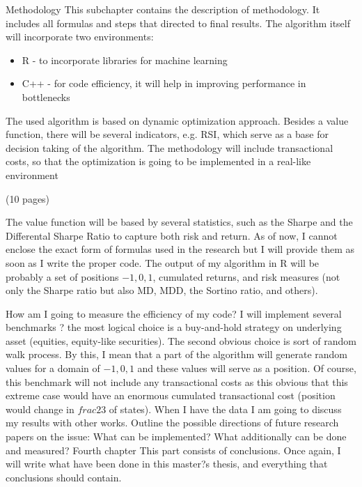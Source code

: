 \documentclass{pracamgr_wne}\usepackage[]{graphicx}\usepackage[]{color}
\begin{document}
Methodology
This subchapter contains the description of methodology. It includes all formulas and steps that directed to final results. 
The algorithm itself will incorporate two environments:
  
\begin{itemize}
\item R - to incorporate libraries for machine learning
\item C++ - for code efficiency, it will help in improving performance in bottlenecks
\end{itemize}

The used algorithm is based on dynamic optimization approach. Besides a value function, there will be several indicators, e.g. RSI, which serve as a base for decision taking of the algorithm. The methodology will include transactional costs, so that the optimization is going to be implemented in a real-like environment

(10 pages)

The value function will be based by several statistics, such as the Sharpe and the Differental Sharpe Ratio to capture both risk and return.
As of now, I cannot enclose the exact form of formulas used in the research but I will provide them as soon as I write the proper code.
The output of my algorithm in R will be probably a set of positions ${-1,0,1}$, 
cumulated returns, and risk measures (not only the Sharpe ratio but also MD, MDD, the Sortino ratio, and 
                                      others).

How am I going to measure the efficiency of my code? I will implement several benchmarks ? the most logical 
choice is a buy-and-hold strategy on underlying asset (equities, equity-like securities). The second obvious 
choice is sort of random walk process. By this, I mean that a part of the algorithm will generate random 
values for a domain of ${-1,0,1}$ and these values will serve as a position. Of course, this benchmark will 
not include any transactional costs as this obvious that this extreme case would have an enormous cumulated 
transactional cost (position would change in $frac{2}{3}$ of states).
When I have the data I am going to discuss my results with other works. Outline the possible directions of 
future research papers on the issue: What can be implemented? What additionally can be done and measured?
Fourth chapter
This part consists of conclusions. Once again, I will write what have been done in this master?s thesis, and 
everything that conclusions should contain.
\end{document}
